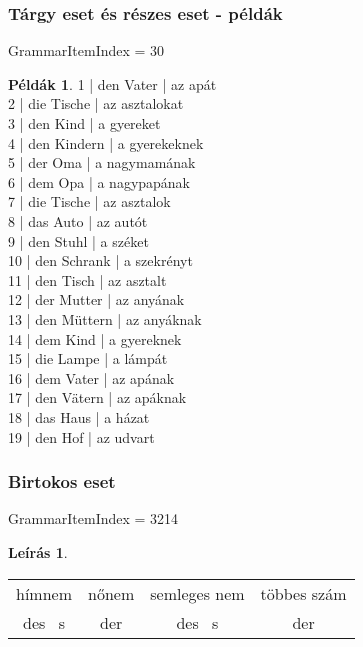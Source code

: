 \documentclass{article}
\theoremstyle{definition}
\newtheorem*{exmp}{Példák}
\newtheorem*{desc}{Leírás}
\begin{document}
\subsubsection{Tárgy eset és részes eset - példák}

GrammarItemIndex = 30

\begin{exmp}
1 | den Vater | az apát\\
2 | die Tische | az asztalokat\\
3 | den Kind | a gyereket\\
4 | den Kindern | a gyerekeknek\\
5 | der Oma | a nagymamának\\
6 | dem Opa | a nagypapának\\
7 | die Tische | az asztalok\\
8 | das Auto | az autót\\
9 | den Stuhl | a széket\\
10 | den Schrank | a szekrényt\\
11 | den Tisch | az asztalt\\
12 | der Mutter | az anyának\\
13 | den Müttern | az anyáknak\\
14 | dem Kind | a gyereknek\\
15 | die Lampe | a lámpát\\
16 | dem Vater | az apának\\
17 | den Vätern | az apáknak\\
18 | das Haus | a házat\\
19 | den Hof | az udvart\\
\end{exmp}

\subsubsection{Birtokos eset}

GrammarItemIndex = 3214

\begin{desc}
\begin{tabular}{cccc}
hímnem & nőnem & semleges nem & többes szám\\
des ~s & der & des ~s & der\\
\end{tabular}
\end{desc}
\end{document}
